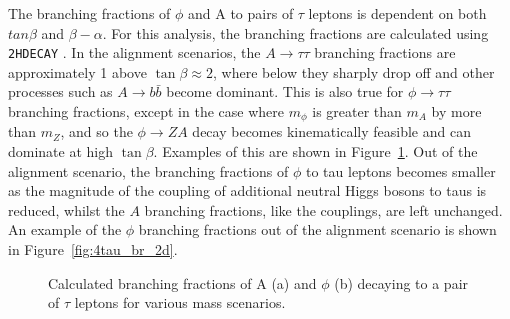 The branching fractions of $\phi$ and A to pairs of $\tau$ leptons is dependent on both $tan\beta$ and $\beta-\alpha$.
For this analysis, the branching fractions are calculated using \texttt{2HDECAY} \cite{Krause:2018wmo}.
In the alignment scenarios, the $A\rightarrow\tau\tau$ branching fractions are approximately 1 above $\tan\beta \approx 2$, where below they sharply drop off and other processes such as $A\rightarrow b\bar{b}$ become dominant.
This is also true for $\phi\rightarrow\tau\tau$ branching fractions, except in the case where $m_\phi$ is greater than $m_A$ by more than $m_Z$, and so the $\phi\rightarrow ZA$ decay becomes kinematically feasible and can dominate at high $\tan\beta$.
Examples of this are shown in Figure~\ref{fig:4tau_br_1d}.
Out of the alignment scenario, the branching fractions of $\phi$ to tau leptons becomes smaller as the magnitude of the coupling of additional neutral Higgs bosons to taus is reduced, whilst the $A$ branching fractions, like the couplings, are left unchanged.
An example of the $\phi$ branching fractions out of the alignment scenario is shown in Figure~\ref{fig:4tau_br_2d}.

\begin{figure}[!hbtp]
\centering
\caption{Calculated branching fractions of A (a) and $\phi$ (b) decaying to a pair of $\tau$ leptons for various mass scenarios.}
\label{fig:4tau_br_1d}
\end{figure}

